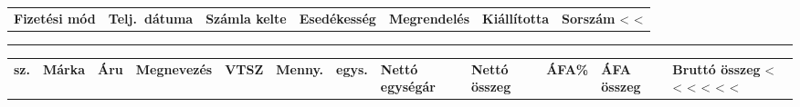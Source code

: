 \documentclass[twoside]{article}
\begin{document}
{\begin{tabularx}{\textwidth}
\hspace{-3mm}
\begin{tabularx}{\textwidth}{>{\hsize=2.1cm\centering}X@{\ }
                             >{\hsize=2.8cm\centering}X@{\ }
                             >{\hsize=2.8cm\centering}X@{\ }
                             >{\hsize=2.8cm\centering}X@{\ }
                             >{\hsize=3.4cm\centering}X@{\ }
                             >{\hsize=2.5cm\centering}X@{\ }
                             >{\hsize=2.0cm\raggedleft}X@{}}
  \textbf{Fizetési mód} & \textbf{Telj.~dátuma} & \textbf{Számla kelte} &
  \textbf{Esedékesség} & \textbf{Megrendelés} & \textbf{Kiállította} & \textbf{Sorszám} 
  \cr
  <%
  <%
\end{tabularx}


\vspace{5mm}

\rule{\textwidth}{1.5pt}

\vspace{3mm}

\hspace{-3mm}
{\scriptsize
\begin{tabularx}{\textwidth}{>{\hsize=0.4cm\centering}X@{\ }
                             >{\hsize=0.9cm\raggedright}X@{\ }
                             >{\hsize=1.9cm\raggedright}X@{\ }
                             >{\hsize=2.9cm\raggedright}X@{\ }
                             >{\hsize=1.9cm\centering}X@{\ }
                             >{\hsize=0.9cm\raggedleft}X@{\ }
                             >{\hsize=0.5cm\centering}X@{\ }
                             >{\hsize=2.0cm\raggedleft}X@{\ }
                             >{\hsize=2.0cm\raggedleft}X@{\ }
                             >{\hsize=0.8cm\raggedleft}X@{\ }
                             >{\hsize=2.0cm\raggedleft}X@{\ }
                             >{\hsize=2.0cm\raggedleft}X@{}
                             }
  \centering\textbf{sz.} & \raggedright\textbf{Márka} & \raggedright\textbf{Áru} & \raggedright\textbf{Megnevezés} &
  \centering\textbf{VTSZ} & \raggedleft\textbf{Menny.} & \centering\textbf{egys.} & 
  \raggedleft\textbf{Nettó egységár} & \raggedleft\textbf{Nettó összeg} & \raggedright\textbf{ÁFA\%} & 
  \raggedleft\textbf{ÁFA összeg} & \raggedleft\textbf{Bruttó összeg}
  \cr
<%
  <%
  <%
  <%
  <%
  \cr
<%
\end{tabularx}
}


\end{tabularx}}
\end{document}
